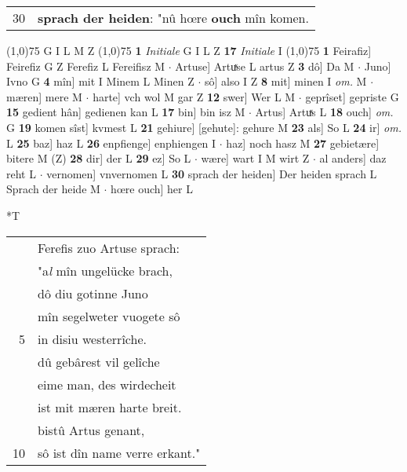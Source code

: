\documentclass[8pt,a4paper,notitlepage]{article}
\begin{document}
\begin{table}[ht]
\begin{minipage}[t]{0.5\linewidth}
\begin{tabular}{rl}
30 & \textbf{sprach der heiden}: "nû hœre \textbf{ouch} mîn komen.\\ 
\end{tabular}
\scriptsize
\line(1,0){75} \newline
G I L M Z \newline
\line(1,0){75} \newline
\textbf{1} \textit{Initiale} G I L Z  \textbf{17} \textit{Initiale} I  \newline
\line(1,0){75} \newline
\textbf{1} Feirafiz] Feirefiz G Z Ferefiz L Fereifisz M  $\cdot$ Artuse] Artuͯse L artus Z \textbf{3} dô] Da M  $\cdot$ Juno] Ivno G \textbf{4} mîn] mit I Minem L Minen Z  $\cdot$ sô] also I Z \textbf{8} mit] minen I \textit{om.} M  $\cdot$ mæren] mere M  $\cdot$ harte] vch wol M gar Z \textbf{12} swer] Wer L M  $\cdot$ geprîset] gepriste G \textbf{15} gedient hân] gedienen kan L \textbf{17} bin] bin isz M  $\cdot$ Artus] Artuͯs L \textbf{18} ouch] \textit{om.} G \textbf{19} komen sîst] kvmest L \textbf{21} gehiure] [gehute]: gehure M \textbf{23} als] So L \textbf{24} ir] \textit{om.} L \textbf{25} baz] haz L \textbf{26} enpfienge] enphiengen I  $\cdot$ haz] noch hasz M \textbf{27} gebietære] bitere M (Z) \textbf{28} dir] der L \textbf{29} ez] So L  $\cdot$ wære] wart I M wirt Z  $\cdot$ al anders] daz reht L  $\cdot$ vernomen] vnvernomen L \textbf{30} sprach der heiden] Der heiden sprach L Sprach der heide M  $\cdot$ hœre ouch] her L \newline
\end{minipage}
\hspace{0.5cm}
\begin{minipage}[t]{0.5\linewidth}
\small
\begin{center}*T
\end{center}
\begin{tabular}{rl}
 & Ferefis zuo Artuse sprach:\\ 
 & "a\textit{l} mîn ungelücke brach,\\ 
 & dô diu gotinne Juno\\ 
 & mîn segelweter vuogete sô\\ 
5 & in disiu westerrîche.\\ 
 & dû gebârest vil gelîche\\ 
 & eime man, des wirdecheit\\ 
 & ist mit mæren harte breit.\\ 
 & bistû Artus genant,\\ 
10 & sô ist dîn name verre erkant."\\ 

\end{tabular}
\end{minipage}
\end{table}
\end{document}
